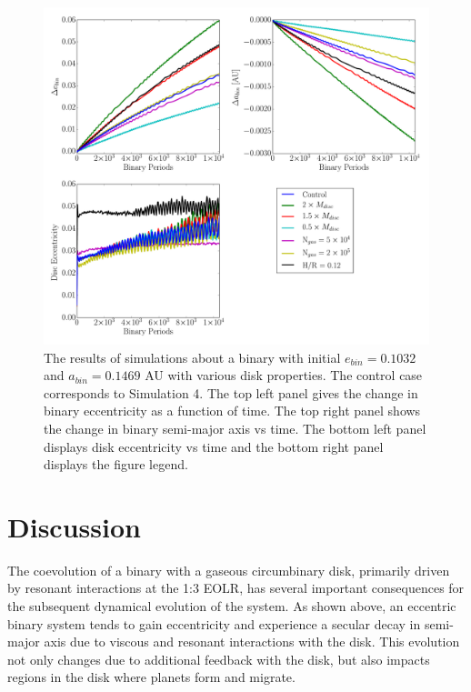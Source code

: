 \begin{figure}
	\includegraphics[width=\textwidth]{f9}
    \caption{The results of simulations about a binary with initial $e_{bin} = 0.1032$ and $a_{bin} = 0.1469$ AU with various disk properties.  The control case corresponds to Simulation 4.  The top left panel gives the change in binary eccentricity as a function of time.  The top right panel shows the change in binary semi-major axis vs time.  The bottom left panel displays disk eccentricity vs time and the bottom right panel displays the figure legend.}
    \label{fig:CBDiskVarying}
\end{figure}
	

\section{Discussion} \label{sec:CBDisk_discuss}
The coevolution of a binary with a gaseous circumbinary disk, primarily driven by resonant interactions at the 1:3 EOLR, has several important consequences for the subsequent dynamical evolution of the system.  As shown above, an eccentric binary system tends to gain eccentricity and experience a secular decay in semi-major axis due to viscous and resonant interactions with the disk.  This evolution not only changes due to additional feedback with the disk, but also impacts regions in the disk where planets form and migrate.

